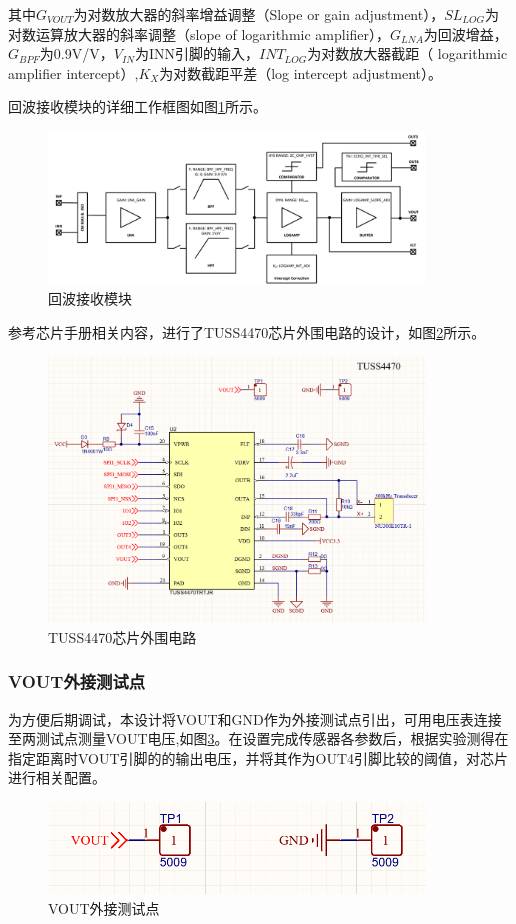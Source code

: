         其中$G_{VOUT}$为对数放大器的斜率增益调整（Slope or gain adjustment），$SL_{LOG}$为对数运算放大器的斜率调整（slope of logarithmic amplifier），$G_{LNA}$为回波增益，$G_{BPF}$为0.9V/V，$V_{IN}$为INN引脚的输入，$INT_{LOG}$为对数放大器截距（ logarithmic amplifier intercept）,$K_X$为对数截距平差（log intercept adjustment）。\par
    回波接收模块的详细工作框图如图\ref{回波接收模块}所示。
    \begin{figure}[H]
        \centering
        \includegraphics[width=10cm]{figure/Analog Front-End Block Diagram.png}
        \caption{回波接收模块}
        \label{回波接收模块}
    \end{figure}
    参考芯片手册相关内容，进行了TUSS4470芯片外围电路的设计，如图\ref{TUSS4470芯片外围电路}所示。
    \begin{figure}[H]
        \centering
        \includegraphics[width=10cm]{figure/TUSS4470 peripheral circuit.png}
        \songti{}\caption{TUSS4470芯片外围电路}
        \label{TUSS4470芯片外围电路}
    \end{figure}
    \subsubsection{VOUT外接测试点}
    为方便后期调试，本设计将VOUT和GND作为外接测试点引出，可用电压表连接至两测试点测量VOUT电压,如图\ref{VOUT引脚}。在设置完成传感器各参数后，根据实验测得在指定距离时VOUT引脚的的输出电压，并将其作为OUT4引脚比较的阈值，对芯片进行相关配置。
    \begin{figure}[H]
    	\centering
    	\includegraphics[width=10cm]{figure/vout pin.png}
    	\songti{}\caption{VOUT外接测试点}
    	\label{VOUT引脚}
    \end{figure}
